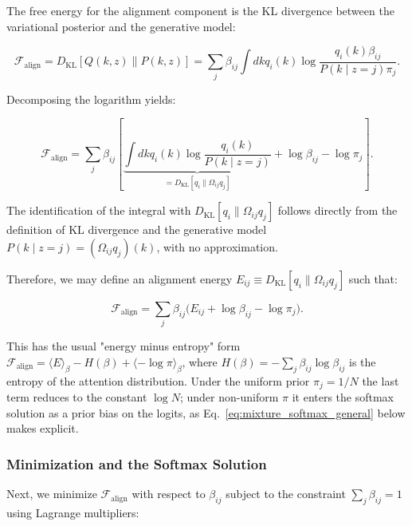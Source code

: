 \documentclass[twoside,11pt]{article}
\begin{document}
The free energy for the alignment component is the KL divergence between the variational posterior and the generative model:

\begin{equation}
\mathcal{F}_{\text{align}} = D_{\mathrm{KL}}[Q(k,z) \| P(k,z)] = \sum_j \beta_{ij} \int dk q_i(k) \log \frac{q_i(k) \beta_{ij}}{P(k \mid z{=}j) \pi_j}.
\end{equation}

Decomposing the logarithm yields:

\begin{equation}
\mathcal{F}_{\text{align}} = \sum_j \beta_{ij} \left[ \underbrace{\int dk q_i(k) \log \frac{q_i(k)}{P(k \mid z{=}j)}}_{= D_{\mathrm{KL}}[q_i \| \Omega_{ij} q_j]} + \log \beta_{ij} - \log \pi_j \right].
\label{eq:mixture_free_energy}
\end{equation}

The identification of the integral with $D_{\mathrm{KL}}[q_i \| \Omega_{ij} q_j]$ follows directly from the definition of KL divergence and the generative model $P(k \mid z{=}j) = (\Omega_{ij} q_j)(k)$, with no approximation.

Therefore, we may define an alignment energy $E_{ij} \equiv D_{\mathrm{KL}}[q_i \| \Omega_{ij} q_j]$ such that:

\begin{equation}
\mathcal{F}_{\text{align}} = \sum_j \beta_{ij} \big( E_{ij} + \log \beta_{ij} - \log \pi_j \big).
\label{eq:mixture_energy_entropy}
\end{equation}

This has the usual "energy minus entropy" form $\mathcal{F}_{\text{align}} = \langle E \rangle_\beta - H(\beta) + \langle -\log \pi \rangle_\beta$, where $H(\beta) = -\sum_j \beta_{ij}\log\beta_{ij}$ is the entropy of the attention distribution. Under the uniform prior $\pi_j = 1/N$ the last term reduces to the constant $\log N$; under non-uniform $\pi$ it enters the softmax solution as a prior bias on the logits, as Eq.~\eqref{eq:mixture_softmax_general} below makes explicit.

\subsubsection{Minimization and the Softmax Solution}

Next, we minimize $\mathcal{F}_{\text{align}}$ with respect to $\beta_{ij}$ subject to the constraint $\sum_j \beta_{ij} = 1$ using Lagrange multipliers:
\end{document}
